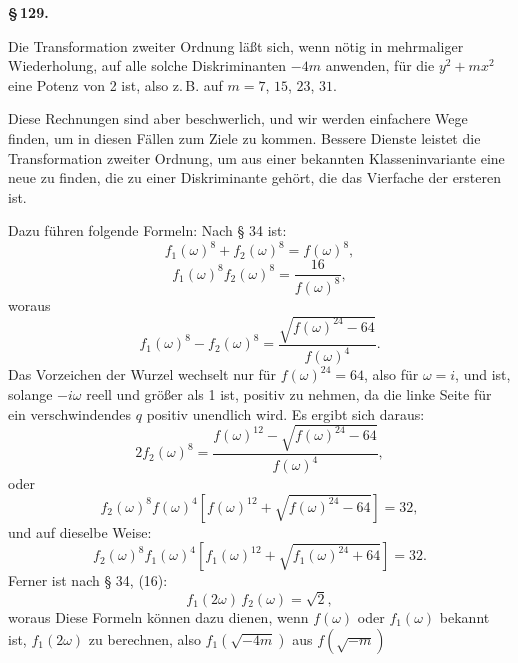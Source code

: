 \textbf{§\,129. }

Die Transformation zweiter Ordnung läßt sich, wenn nötig
in mehrmaliger Wiederholung, auf alle solche Diskriminanten
$-4m$ anwenden, für die $y^2 + m x^2$ eine Potenz von 2 ist, also
z.\,B. auf $m = 7$, $15$, $23$, $31$.

Diese Rechnungen sind aber beschwerlich, und wir werden
einfachere Wege finden, um in diesen Fällen zum Ziele zu kommen.
Bessere Dienste leistet die Transformation zweiter Ordnung, um
aus einer bekannten Klasseninvariante eine neue zu finden, die zu
einer Diskriminante gehört, die das Vierfache der ersteren ist.

Dazu führen folgende Formeln:
Nach § 34 ist:
\[
f_1(\omega)^8 + f_2(\omega)^8 = f(\omega)^8,
\]
\[
f_1(\omega)^8 f_2(\omega)^8 = \frac{16}{f(\omega)^8},
\]
woraus
\[
f_1(\omega)^8 - f_2(\omega)^8 = \frac{\sqrt{f(\omega)^{24} - 64}}{f(\omega)^4}.
\]
Das Vorzeichen der Wurzel wechselt nur für $f(\omega)^{24} = 64$,
also für $\omega = i$, und ist, solange $-i\omega$ reell und größer als 1
ist, positiv zu nehmen, da die linke Seite für ein verschwindendes
$q$ positiv unendlich wird. Es ergibt sich daraus:
\[
2 f_2(\omega)^8 = \frac{f(\omega)^{12} - \sqrt{f(\omega)^{24} - 64}}{f(\omega)^4},
\]
oder
\[
f_2(\omega)^8 f(\omega)^4 \left[f(\omega)^{12} + \sqrt{f(\omega)^{24} - 64}\right] = 32,
\]
und auf dieselbe Weise:
\[
f_2(\omega)^8 f_1(\omega)^4 \left[f_1(\omega)^{12} + \sqrt{f_1(\omega)^{24} + 64}\right] = 32.
\]
Ferner ist nach § 34, (16):
\[
f_1(2\omega)\,f_2(\omega) = \sqrt{2},
\]
woraus
Diese Formeln können dazu dienen, wenn $f(\omega)$ oder $f_1(\omega)$
bekannt ist, $f_1(2\omega)$ zu berechnen, also $f_1(\sqrt{-4m})$ aus $f(\sqrt{-m})$
